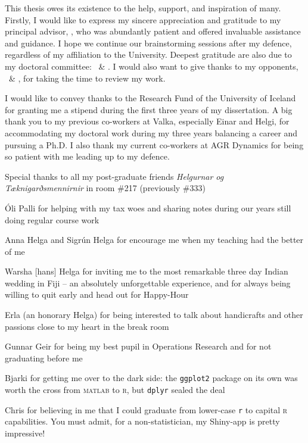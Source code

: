 
\makeatletter 
This thesis owes its existence to the help, support, and inspiration of many. 
Firstly, I would like to express my sincere appreciation and gratitude to my 
principal advisor, \@advisor, who was abundantly patient and offered invaluable 
assistance and guidance. I hope we continue our brainstorming sessions after my 
defence, regardless of my affiliation to the University. 
Deepest gratitude are also due to my doctoral committee: \@committeeA\ \& 
\@committeeB.
I would also want to give thanks to my opponents, \@opponentA\ \& \@opponentB, 
for taking the time to review my work.
\makeatother

I would like to convey thanks to the Research Fund of the University of 
Iceland for granting me a stipend during the first three years of my 
dissertation. 
A big thank you to my previous co-workers at Valka, especially Einar and Helgi, 
for accommodating my doctoral work during my three years balancing a 
career and pursuing a Ph.D.
I also thank my current co-workers at AGR Dynamics for being so patient with me 
leading up to my defence.

Special thanks to all my post-graduate friends \emph{Helgurnar og 
Tæknigarðsmennirnir} in room \#217 (previously \#333)
\begin{enumerate*}[label={{\!}}, after={{}}]
    \item Óli Palli for helping with my tax woes and sharing notes during our 
    years still doing regular course work
    \item Anna Helga and Sigrún Helga for encourage me when my teaching had the 
    better of me
    \item Warsha [hans] Helga for inviting me to the most remarkable three day 
    Indian wedding in Fiji -- an absolutely unforgettable experience, and for 
    always being willing to quit early and head out for Happy-Hour
    \item Erla (an honorary Helga) for being interested to talk about 
    handicrafts and other passions close to my heart in the break room
    \item Gunnar Geir for being my best pupil in Operations Research and for 
    not graduating before me
    \item Bjarki for getting me over to the dark side: 
    the \texttt{ggplot2} package on its own was worth the cross from 
    \textsc{matlab} to \textsc{r}, but \texttt{dplyr} sealed the deal
    \item Chris for believing in me that I could graduate from lower-case 
    \texttt{r} to capital \textsc{r} capabilities. You must admit, for a 
    non-statistician, my Shiny-app is pretty impressive!
\end{enumerate*}

